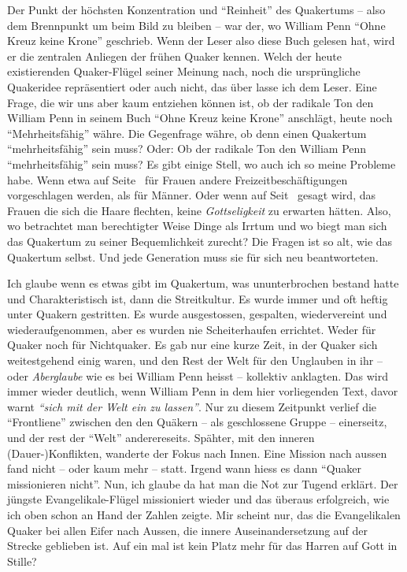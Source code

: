 \begin{center}

\end{center}

\medskip

Der Punkt der höchsten Konzentration und "`Reinheit"' des Quakertums -- also dem
Brennpunkt um beim Bild zu bleiben -- war der, wo William Penn "`Ohne Kreuz keine Krone"' geschrieb. Wenn der Leser also diese Buch gelesen hat, wird er die zentralen
Anliegen der frühen Quaker kennen. Welch der heute existierenden Quaker-Flügel
seiner Meinung nach, noch die ursprüngliche Quakeridee repräsentiert oder auch
nicht, das über lasse ich dem Leser. Eine Frage, die wir uns aber kaum entziehen
können ist, ob der radikale Ton den William Penn in seinem Buch "`Ohne Kreuz
keine Krone"' anschlägt, heute noch "`Mehrheitsfähig"' währe. Die Gegenfrage währe,
ob denn einen Quakertum "`mehrheitsfähig"' sein muss? Oder: Ob der radikale Ton den William Penn "`mehrheitsfähig"' sein muss?
Es gibt einige Stell, wo auch 
ich so meine Probleme habe. Wenn etwa auf Seite~\pageref{kap15_ab5} für
Frauen andere Freizeitbeschäftigungen vorgeschlagen werden, als für Männer. Oder
wenn auf Seit~\pageref{ref:haarflechten} gesagt wird, das Frauen die sich die
Haare flechten, keine \textit{Gottseligkeit} zu erwarten hätten. Also, wo
betrachtet man berechtigter Weise Dinge als Irrtum und wo biegt man sich das
Quakertum zu seiner Bequemlichkeit zurecht? Die Fragen ist so alt, wie das
Quakertum selbst. Und jede Generation muss sie für sich neu beantworteten.

\medskip

Ich glaube wenn es etwas gibt im Quakertum, was ununterbrochen bestand hatte und
Charakteristisch ist, dann die Streitkultur. Es wurde immer und oft heftig unter
Quakern gestritten. Es wurde ausgestossen, gespalten, wiedervereint und
wiederaufgenommen, aber es wurden nie Scheiterhaufen errichtet. Weder für Quaker
noch für Nichtquaker. Es gab nur eine kurze Zeit, in der Quaker sich weitestgehend
einig waren, und den Rest der Welt für den Unglauben in ihr -- oder
\textit{Aberglaube} wie es bei William Penn heisst -- kollektiv anklagten. Das
wird immer wieder deutlich, wenn William Penn in dem hier vorliegenden Text, davor warnt \textit{"`sich mit
der Welt ein zu lassen"'}. Nur zu diesem Zeitpunkt verlief die "`Frontliene"' zwischen den den Quäkern -- als geschlossene Gruppe -- einerseitz, und der rest der "`Welt"' anderereseits. Spähter, mit den inneren (Dauer-)Konflikten, wanderte der Fokus
nach Innen. Eine Mission nach aussen fand nicht -- oder kaum mehr -- statt.
Irgend wann hiess es dann "`Quaker missionieren nicht"'. Nun, ich glaube da hat
man die Not zur Tugend erklärt. Der jüngste Evangelikale-Flügel missioniert
wieder und das überaus erfolgreich, wie ich oben schon an Hand der Zahlen zeigte. Mir scheint nur,
das die Evangelikalen Quaker bei allen Eifer nach Aussen, die innere
Auseinandersetzung auf der Strecke geblieben ist. Auf ein mal ist kein Platz mehr für das Harren auf Gott in Stille?

